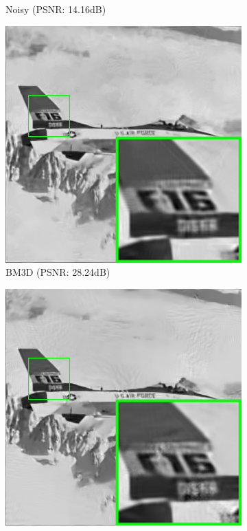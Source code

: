\begin{figure}
\begin{subfigure}[t]{0.2\textwidth}
		\caption{Noisy (PSNR: 14.16dB)}
    \end{subfigure}
    \hfill
    \begin{subfigure}[t]{0.2\textwidth}
        \centering
        \includegraphics[width=1\textwidth]{images/pgpd/br_BM3D_50_airplane.png}
		\caption{BM3D (PSNR: 28.24dB)}
    \end{subfigure}
    \hfill
    \begin{subfigure}[t]{0.2\textwidth}
        \centering
        \includegraphics[width=1\textwidth]{images/pgpd/br_LSSC_50_airplane.png}

\end{subfigure}
\end{figure}
